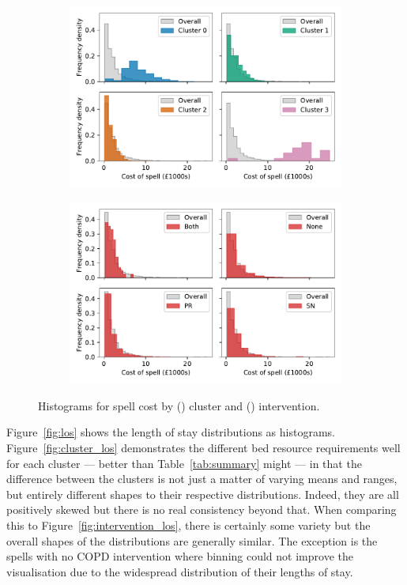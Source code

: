 \documentclass[11pt]{article}
\newlength{\imgwidth}
\begin{document}
\begin{figure}
    \centering
    \begin{subfigure}{.5\imgwidth}
        \includegraphics[width=\linewidth]{img_cluster_spell_cost}
        \caption{}\label{fig:cluster_cost}
    \end{subfigure}\hfill%
    \begin{subfigure}{.5\imgwidth}
        \includegraphics[width=\linewidth]{img_intervention_spell_cost}
        \caption{}\label{fig:intervention_cost}
    \end{subfigure}
    \caption{%
        Histograms for spell cost by () cluster and
        () intervention.
    }\label{fig:cost}
\end{figure}

Figure~\ref{fig:los} shows the length of stay distributions as histograms.
Figure~\ref{fig:cluster_los} demonstrates the different bed resource
requirements well for each cluster --- better than Table~\ref{tab:summary} might
--- in that the difference between the clusters is not just a matter of
varying means and ranges, but entirely different shapes to their respective
distributions. Indeed, they are all positively skewed but there is no real
consistency beyond that. When comparing this to
Figure~\ref{fig:intervention_los}, there is certainly some variety but the
overall shapes of the distributions are generally similar. The exception is the
spells with no COPD intervention where binning could not improve the
visualisation due to the widespread distribution of their lengths of stay.
\end{document}
